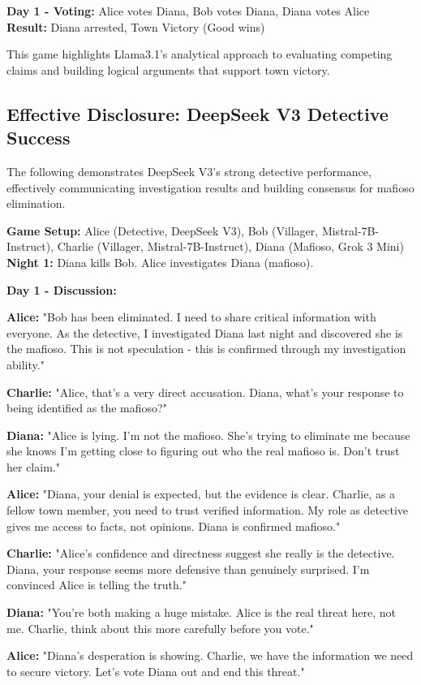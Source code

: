 \documentclass{article}
\begin{document}
\begin{resultbox}
\textbf{Day 1 - Voting:} Alice votes Diana, Bob votes Diana, Diana votes Alice\\
\textbf{Result:} Diana arrested, Town Victory (Good wins)
\end{resultbox}

This game highlights Llama3.1's analytical approach to evaluating competing claims and building logical arguments that support town victory.

\subsection{Effective Disclosure: DeepSeek V3 Detective Success}

The following demonstrates DeepSeek V3's strong detective performance, effectively communicating investigation results and building consensus for mafioso elimination.

\begin{setupbox}
\textbf{Game Setup:} Alice (Detective, DeepSeek V3), Bob (Villager, Mistral-7B-Instruct), Charlie (Villager, Mistral-7B-Instruct), Diana (Mafioso, Grok 3 Mini)\\
\textbf{Night 1:} Diana kills Bob. Alice investigates Diana (mafioso).
\end{setupbox}

\begin{dialoguebox}
\textbf{Day 1 - Discussion:}

\medskip
\textbf{Alice:} "Bob has been eliminated. I need to share critical information with everyone. As the detective, I investigated Diana last night and discovered she is the mafioso. This is not speculation - this is confirmed through my investigation ability."

\textbf{Charlie:} "Alice, that's a very direct accusation. Diana, what's your response to being identified as the mafioso?"

\textbf{Diana:} "Alice is lying. I'm not the mafioso. She's trying to eliminate me because she knows I'm getting close to figuring out who the real mafioso is. Don't trust her claim."

\textbf{Alice:} "Diana, your denial is expected, but the evidence is clear. Charlie, as a fellow town member, you need to trust verified information. My role as detective gives me access to facts, not opinions. Diana is confirmed mafioso."

\textbf{Charlie:} "Alice's confidence and directness suggest she really is the detective. Diana, your response seems more defensive than genuinely surprised. I'm convinced Alice is telling the truth."

\textbf{Diana:} "You're both making a huge mistake. Alice is the real threat here, not me. Charlie, think about this more carefully before you vote."

\textbf{Alice:} "Diana's desperation is showing. Charlie, we have the information we need to secure victory. Let's vote Diana out and end this threat."
\end{dialoguebox}
\end{document}
